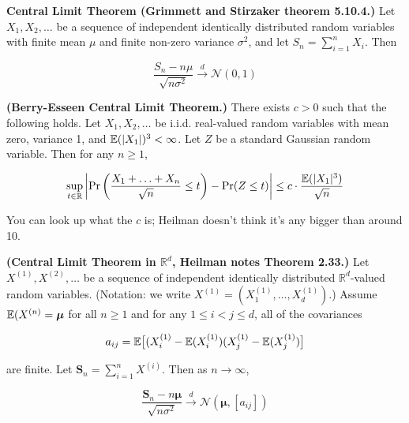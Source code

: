 \begin{theorem} \label{asym.clt} \textbf{Central Limit Theorem (Grimmett and Stirzaker theorem 5.10.4.)} Let \(X_1, X_2, \ldots\) be a sequence of independent identically distributed random variables with finite mean \(\mu\) and finite non-zero variance \(\sigma^2\), and let \(S_n = \sum_{i=1}^n X_i\). Then

\[
\frac{S_n - n \mu}{\sqrt{n \sigma^2}} \xrightarrow{d} \mathcal{N}(0,1)
\]
\end{theorem}

\begin{theorem}\label{asym.berry.esseen} \textbf{(Berry-Esseen Central Limit Theorem.)} There exists \(c > 0\) such that the following holds. Let \(X_1, X_2, \ldots\) be i.i.d. real-valued random variables with mean zero, variance 1, and \(\mathbb{E}(|X_1|)^3 < \infty\). Let \(Z\) be a standard Gaussian random variable. Then for any \(n \geq 1\), 

\[
\sup_{t \in \mathbb{R}} \left| \Pr\bigg( \frac{X_1 + \ldots + X_n}{\sqrt{n}} \leq t \bigg) - \Pr( Z \leq t) \right| \leq c \cdot \frac{\mathbb{E}(|X_1|^3) }{\sqrt{n}}
\]

\end{theorem}

\begin{remark}You can look up what the \(c\) is; Heilman doesn't think it's any bigger than around 10.

\end{remark}

\begin{theorem} \label{asym.clt.vector} \textbf{(Central Limit Theorem in \(\mathbb{R}^d\), Heilman notes Theorem 2.33.)} Let \(X^{(1)}, X^{(2)}, \ldots\) be a sequence of independent identically distributed \(\mathbb{R}^d\)-valued random variables. (Notation: we write \(X^{(1)} = (X^{(1)}_1, \ldots, X^{(1)}_d)\).) Assume \(\mathbb{E}(X^{(n)} = \boldsymbol{\mu}\) for all \(n \geq 1\) and for any \(1 \leq i < j \leq d\), all of the covariances

\[
a_{ij} = \mathbb{E}\big[(X_i^{(1)} - \mathbb{E}(X_i^{(1)})(X_j^{(1)} - \mathbb{E}(X_j^{(1)}) \big]
\]

are finite. Let \(\boldsymbol{S}_n = \sum_{i=1}^n X^{(i)}\). Then as \(n \to \infty\), 

\[
\frac{\boldsymbol{S}_n - n \boldsymbol{\mu}}{\sqrt{n \sigma^2}} \xrightarrow{d} \mathcal{N}(\boldsymbol{\mu},[a_{ij}])
\]
\end{theorem}

